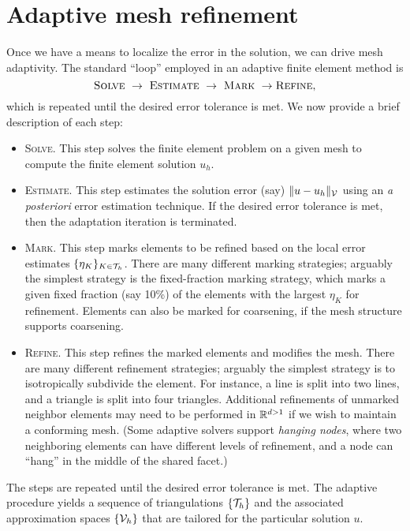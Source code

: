 \section{Adaptive mesh refinement}
Once we have a means to localize the error in the solution, we can drive mesh adaptivity. The standard ``loop'' employed in an adaptive finite element method is
\begin{equation*}
  \textsc{Solve} \ \rightarrow \ \textsc{Estimate} \ \rightarrow \ \textsc{Mark} \ \rightarrow \textsc{Refine},
\end{equation*}
which is repeated until the desired error tolerance is met. We now provide a brief description of each step:
\begin{itemize}
\item \textsc{Solve}. This step solves the finite element problem on a given mesh to compute the finite element solution $u_h$.
\item \textsc{Estimate}. This step estimates the solution error (say) $ \| u - u_h \|_{\mathcal{V}}$ using an \textit{a posteriori} error estimation technique.  If the desired error tolerance is met, then the adaptation iteration is terminated.
\item \textsc{Mark}. This step marks elements to be refined based on the local error estimates $\{ \eta_K \}_{K \in \mathcal{T}_h}$.  There are many different marking strategies; arguably the simplest strategy is the fixed-fraction marking strategy, which marks a given fixed fraction (say 10\%) of the elements with the largest $\eta_K$ for refinement.  Elements can also be marked for coarsening, if the mesh structure supports coarsening.
\item \textsc{Refine}.  This step refines the marked elements and modifies the mesh.  There are many different refinement strategies; arguably the simplest strategy is to isotropically subdivide the element.  For instance, a line is split into two lines, and a triangle is split into four triangles. Additional refinements of unmarked neighbor elements may need to be performed in $\mathbb{R}^{d > 1}$ if we wish to maintain a conforming mesh.  (Some adaptive solvers support \emph{hanging nodes}, where two neighboring elements can have different levels of refinement, and a node can ``hang'' in the middle of the shared facet.)
\end{itemize}
The steps are repeated until the desired error tolerance is met.  The adaptive procedure yields a sequence of triangulations $\{\mathcal{T}_h \}$ and the associated approximation spaces $\{ \mathcal{V}_h \}$ that are tailored for the particular solution $u$.

